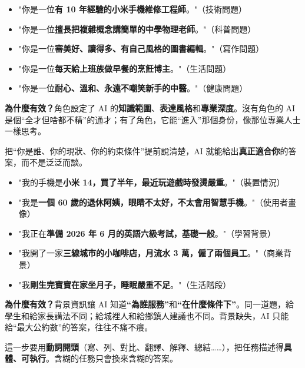 
\begin{itemize}
  \item "你是一位\textbf{有 10 年經驗的小米手機維修工程師}。"（技術問題）
  \item "你是一位\textbf{擅長把複雜概念講簡單的中學物理老師}。"（科普問題）
  \item "你是一位\textbf{審美好、讀得多、有自己風格的圖書編輯}。"（寫作問題）
  \item "你是一位\textbf{每天給上班族做早餐的烹飪博主}。"（生活問題）
  \item "你是一位\textbf{耐心、溫和、永遠不嘲笑新手的中醫}。"（健康問題）
\end{itemize}

\textbf{為什麼有效？}角色設定了 AI 的\textbf{知識範圍}、\textbf{表達風格}和\textbf{專業深度}。沒有角色的 AI 是個“全才但啥都不精”的通才；有了角色，它能“進入”那個身份，像那位專業人士一樣思考。


把“你是誰、你的現狀、你的約束條件”提前說清楚，AI 就能給出\textbf{真正適合你}的答案，而不是泛泛而談。


\begin{itemize}
  \item "我的手機是\textbf{小米 14，買了半年，最近玩遊戲時發燙嚴重}。"（裝置情況）
  \item "我是\textbf{一個 60 歲的退休阿姨，眼睛不太好，不太會用智慧手機}。"（使用者畫像）
  \item "我正在\textbf{準備 2026 年 6 月的英語六級考試，基礎一般}。"（學習背景）
  \item "我開了一家\textbf{三線城市的小咖啡店，月流水 3 萬，僱了兩個員工}。"（商業背景）
  \item "我\textbf{剛生完寶寶在家坐月子，睡眠嚴重不足}。"（生活階段）
\end{itemize}

\textbf{為什麼有效？}背景資訊讓 AI 知道\textbf{“為誰服務”}和\textbf{“在什麼條件下”}。同一道題，給學生和給家長講法不同；給城裡人和給鄉鎮人建議也不同。背景缺失，AI 只能給“最大公約數”的答案，往往不痛不癢。


這一步要用\textbf{動詞開頭}（寫、列、對比、翻譯、解釋、總結……），把任務描述得\textbf{具體、可執行}。含糊的任務只會換來含糊的答案。

